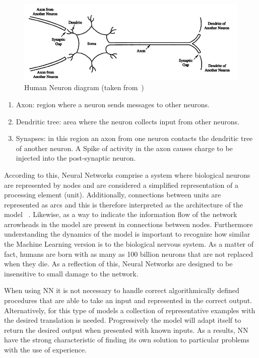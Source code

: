 \begin{figure}[htbp]
  \centering
  \includegraphics[width=\textwidth]{images/neuron}
  \caption{ Human Neuron diagram (taken from~\cite{fausett93}) }
  \label{fig:humanNeuron}
\end{figure}

\begin{enumerate}
 \item Axon:  region where a neuron sends messages to other neurons.
 \item Dendritic tree: area where the neuron collects input from other neurons.
 \item Synapses: in this region an axon from one neuron contacts the dendritic tree of another neuron. A Spike of activity in the axon causes charge to be injected into the post-synaptic neuron.
\end{enumerate}

According to this, Neural Networks comprise a system where biological neurons are represented by nodes and are considered a simplified representation of a processing element (unit). Additionally, connections between units are represented as arcs and this is therefore interpreted as the architecture of the model ~\cite{fausett93}. Likewise, as a way to indicate the information flow of the network arrowheads in the model are present in connections between nodes. Furthermore understanding the dynamics of the model is important to recognize how similar the Machine Learning version is to the biological nervous system. As a matter of fact, humans are born with as many as 100 billion neurons that are not replaced when they die. As a reflection of this, Neural Networks are designed to be insensitive to small damage to the network. 

When using  \ac{NN}  it is not necessary to handle correct algorithmically defined procedures that are able to take an input and represented in the correct output. Alternatively, for this type of models a collection of representative examples with the desired translation is needed. Progressively the model will adapt itself to return the desired output when presented with known inputs. As a results, \ac{NN}  have the strong characteristic of finding its  own solution to particular problems with the use of experience. 

